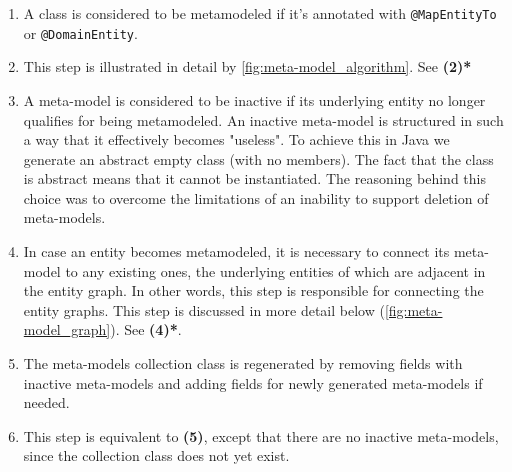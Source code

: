\begin{enumerate}[label={\textbf{(\arabic*)}}]
    \item A class is considered to be metamodeled if it’s annotated with \texttt{@MapEntityTo} or \texttt{@DomainEntity}.
    \item This step is illustrated in detail by \ref{fig:meta-model_algorithm}. See \textbf{(2)*}
    \item A meta-model is considered to be inactive if its underlying entity no longer qualifies for being metamodeled. An inactive meta-model is structured in such a way that it effectively becomes "useless". To achieve this in Java we generate an abstract empty class (with no members). The fact that the class is abstract means that it cannot be instantiated. The reasoning behind this choice was to overcome the limitations of an inability to support deletion of meta-models.
    \item In case an entity becomes metamodeled, it is necessary to connect its meta-model to any existing ones, the underlying entities of which are adjacent in the entity graph. In other words, this step is responsible for connecting the entity graphs. This step is discussed in more detail below (\ref{fig:meta-model_graph}). See \textbf{(4)*}.
    \item The meta-models collection class is regenerated by removing fields with inactive meta-models and adding fields for newly generated meta-models if needed.
    \item This step is equivalent to \textbf{(5)}, except that there are no inactive meta-models, since the collection class does not yet exist.
\end{enumerate}

